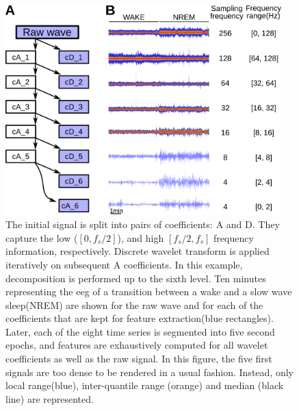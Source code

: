 
\begin{figure}[h!]

  \centering    
    \includegraphics[width=0.95\textwidth]{figures/dwd.pdf}
  \caption{
  The initial signal is split into pairs of coefficients: A and D. They capture the low ($[0, f_s/2]$), and high $[f_s/2, f_s]$ frequency information, respectively.
  Discrete wavelet transform is applied iteratively on subsequent A coefficients. In this example, decomposition is performed up to the sixth level.
  Ten minutes representing the \gls{eeg} of a transition between a wake and a slow wave sleep(NREM) are shown for the raw wave and for each of the coefficients that are kept for feature extraction(blue rectangles). 
  Later, each of the eight time series is segmented into five second epochs, and features are exhaustively computed for all wavelet coefficients as well as the raw signal.
  In this figure, the five first signals are too dense to be rendered in a usual fashion. Instead, only local range(blue), inter-quantile range (orange) and median (black line) are represented.
  \label{fig:dwd}
  }
           
\end{figure}

